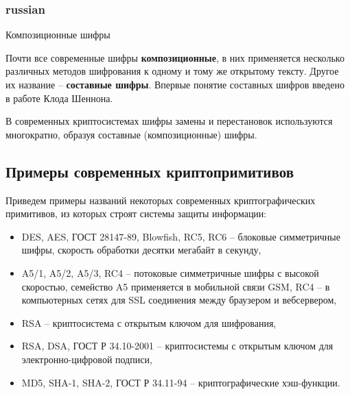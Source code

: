 \subsubsection{russian}{Композиционные шифры}

Почти все современные шифры \textbf{композиционные},
в них применяется несколько различных методов шифрования к одному и тому же открытому тексту.  Другое их название -- \textbf{составные шифры}. Впервые понятие составных шифров введено в работе Клода Шеннона.

В современных криптосистемах шифры замены и перестановок используются многократно, образуя составные (композиционные) шифры.


\subsection{Примеры современных криптопримитивов}

Приведем примеры названий некоторых современных криптографических примитивов, из которых строят системы защиты информации:
\begin{itemize}
    \item DES, AES, ГОСТ 28147-89, Blowfish, RC5, RC6 -- блоковые симметричные шифры, скорость обработки десятки мегабайт в секунду,
    \item A5/1, A5/2, A5/3, RC4 -- потоковые симметричные шифры с высокой скоростью, семейство A5 применяется в мобильной связи GSM, RC4 -- в компьютерных сетях для SSL соединения между браузером и вебсервером,
    \item RSA -- криптосистема с открытым ключом для шифрования,
    \item RSA, DSA, ГОСТ Р 34.10-2001 -- криптосистемы с открытым ключом для электронно-цифровой подписи,
    \item MD5, SHA-1, SHA-2, ГОСТ Р 34.11-94 -- криптографические хэш-функции.
\end{itemize}




